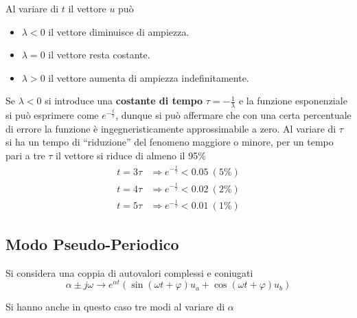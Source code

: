 Al variare di $t$ il vettore $u$ può
\begin{itemize}
\item $\lambda<0$ il vettore diminuisce di ampiezza.
\item $\lambda=0$ il vettore resta costante.
\item $\lambda>0$ il
vettore aumenta di ampiezza indefinitamente.
\end{itemize}

Se $\lambda<0$ si introduce una \textbf{costante di tempo} $\tau =
-\frac{1}{\lambda}$
e la funzione esponenziale si può esprimere come
$e^{-\frac{t}{\tau}}$, dunque si può affermare che con una certa percentuale di
errore la funzione è ingegneristicamente approssimabile a zero.
Al variare di $\tau$ si ha un tempo di ``riduzione'' del fenomeno maggiore o
minore, per un tempo pari a tre $\tau$ il vettore si riduce di almeno il 95\%
$$\begin{aligned}
t=3\tau&\Rightarrow e^{-\frac{t}{\tau}}
< 0.05\ (5\%)\\
t=4\tau&\Rightarrow e^{-\frac{t}{\tau}}
< 0.02\ (2\%)\\
t=5\tau&\Rightarrow e^{-\frac{t}{\tau}}
< 0.01\ (1\%)
\end{aligned}$$

\newpage
\subsection{Modo Pseudo-Periodico}
\label{sec:modo_pseudo_periodico}
Si considera una coppia di autovalori complessi e coniugati
$$
\alpha \pm j\omega \rightarrow e^{\alpha t}\left(\sin(\omega t + \varphi)u_a +
\cos(\omega t + \varphi)u_b\right)
$$

Si hanno anche in questo caso tre modi al variare di $\alpha$

